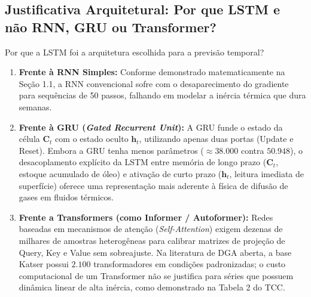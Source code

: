 \documentclass[11pt,a4paper]{article}
\begin{document}
\subsection{Justificativa Arquitetural: Por que LSTM e não RNN, GRU ou Transformer?}
\begin{decisionBox}{Por que a LSTM foi a arquitetura escolhida para a previsão temporal?}
\begin{enumerate}[leftmargin=0.8cm]
  \item \textbf{Frente à RNN Simples:} Conforme demonstrado matematicamente na Seção 1.1, a RNN convencional sofre com o desaparecimento do gradiente para sequências de 50 passos, falhando em modelar a inércia térmica que dura semanas.
  \item \textbf{Frente à GRU (\textit{Gated Recurrent Unit}):} A GRU funde o estado da célula $\mathbf{C}_t$ com o estado oculto $\mathbf{h}_t$, utilizando apenas duas portas (Update e Reset). Embora a GRU tenha menos parâmetros ($\approx 38.000$ contra $50.948$), o desacoplamento explícito da LSTM entre memória de longo prazo ($\mathbf{C}_t$, estoque acumulado de óleo) e ativação de curto prazo ($\mathbf{h}_t$, leitura imediata de superfície) oferece uma representação mais aderente à física de difusão de gases em fluidos térmicos.
  \item \textbf{Frente a Transformers (como Informer / Autoformer):} Redes baseadas em mecanismos de atenção (\textit{Self-Attention}) exigem dezenas de milhares de amostras heterogêneas para calibrar matrizes de projeção de Query, Key e Value sem sobreajuste. Na literatura de DGA aberta, a base Katser possui $2.100$ transformadores em condições padronizadas; o custo computacional de um Transformer não se justifica para séries que possuem dinâmica linear de alta inércia, como demonstrado na Tabela 2 do TCC.
\end{enumerate}
\end{decisionBox}
\end{document}
